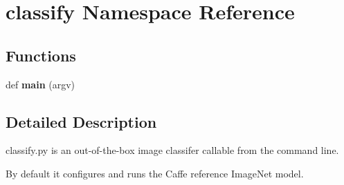 \hypertarget{namespaceclassify}{}\section{classify Namespace Reference}
\label{namespaceclassify}
\subsection*{Functions}
\begin{DoxyCompactItemize}
\item 
\mbox{\label{namespaceclassify_aa0d4c69fc9bd7fd181d6d6b86724eb4a}} 
def {\bfseries main} (argv)
\end{DoxyCompactItemize}


\subsection{Detailed Description}
\begin{DoxyVerb}classify.py is an out-of-the-box image classifer callable from the command line.

By default it configures and runs the Caffe reference ImageNet model.
\end{DoxyVerb}
 